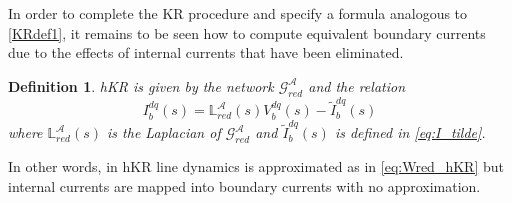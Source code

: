 \documentclass[a4paper]{article}
\theoremstyle{plain}
\newtheorem{defn}{Definition}
\def\Lset{\mathbb{L}}
\newcommand{\AAA}{{\mathcal A}}
\newcommand{\GG}{{\mathcal G}}
\begin{document}
     In order to complete the KR procedure and specify a formula analogous to \eqref{KRdef1}, it remains to be seen how to compute equivalent boundary currents due to the effects of internal currents that have been eliminated.
\begin{defn}
\label{def:hKR}
hKR is given by the network $\GG_{red}^{\AAA}$ and the relation
	\begin{equation}
     		\label{hKRa}
     		I_b^{dq}(s)=\Lset_{red}^{\AAA}(s)V_b^{dq}(s)-\tilde I_b^{dq}(s)
              \end{equation} 
     		where $\Lset_{red}^{\AAA}(s)$ is the Laplacian of $\GG_{red}^{\AAA}$ and $\tilde I_b^{dq}(s)$ is defined in \eqref{eq:I_tilde}.
		\end{defn}
In other words, in hKR line dynamics is approximated as in \eqref{eq:Wred_hKR} but internal currents are mapped into boundary currents with no approximation.
\end{document}
